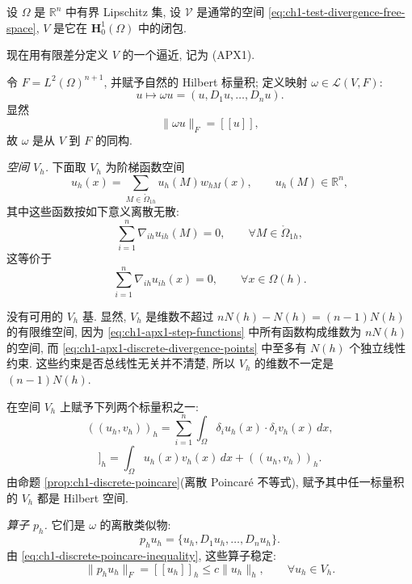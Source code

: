 设 $\Omega$ 是 $\mathbb R^n$ 中有界 Lipschitz 集, 设 $\mathcal V$ 是通常的空间 \eqref{eq:ch1-test-divergence-free-space}, $V$ 是它在 $\mathbf H_0^1(\Omega)$ 中的闭包.

现在用有限差分定义 $V$ 的一个逼近, 记为 (APX1).

令 $F=L^2(\Omega)^{n+1}$, 并赋予自然的 Hilbert 标量积; 定义映射 $\omega\in\mathcal L(V,F)$:
\[
u\longmapsto\omega u=(u,D_1u,\ldots,D_nu).
\]
显然
\[
\|\omega u\|_F=[[u]],
\]
故 $\omega$ 是从 $V$ 到 $F$ 的同构.

\emph{空间 $V_h$.} 下面取 $V_h$ 为阶梯函数空间
\begin{equation}
u_h(x)=\sum_{M\in\mathring\Omega_{1h}}u_h(M)w_{hM}(x),
\qquad u_h(M)\in\mathbb R^n,
\label{eq:ch1-apx1-step-functions}
\end{equation}
其中这些函数按如下意义离散无散:
\begin{equation}
\sum_{i=1}^n\nabla_{ih}u_{ih}(M)=0,
\qquad\forall M\in\mathring\Omega_{1h},
\label{eq:ch1-apx1-discrete-divergence-points}
\end{equation}
这等价于
\begin{equation}
\sum_{i=1}^n\nabla_{ih}u_{ih}(x)=0,
\qquad\forall x\in\Omega(h).
\label{eq:ch1-apx1-discrete-divergence-domain}
\end{equation}

没有可用的 $V_h$ 基. 显然, $V_h$ 是维数不超过 $nN(h)-N(h)=(n-1)N(h)$ 的有限维空间, 因为 \eqref{eq:ch1-apx1-step-functions} 中所有函数构成维数为 $nN(h)$ 的空间, 而 \eqref{eq:ch1-apx1-discrete-divergence-points} 中至多有 $N(h)$ 个独立线性约束. 这些约束是否总线性无关并不清楚, 所以 $V_h$ 的维数不一定是 $(n-1)N(h)$.

在空间 $V_h$ 上赋予下列两个标量积之一:
\begin{equation}
((u_h,v_h))_h
=\sum_{i=1}^n\int_\Omega\delta_iu_h(x)\cdot\delta_iv_h(x)\,dx,
\label{eq:ch1-apx1-gradient-inner-product}
\end{equation}
\begin{equation}
[[u_h,v_h]]_h
=\int_\Omega u_h(x)v_h(x)\,dx+((u_h,v_h))_h.
\label{eq:ch1-apx1-h01-inner-product}
\end{equation}
由命题 \ref{prop:ch1-discrete-poincare}(离散 Poincaré 不等式), 赋予其中任一标量积的 $V_h$ 都是 Hilbert 空间.

\emph{算子 $p_h$.} 它们是 $\omega$ 的离散类似物:
\begin{equation}
p_hu_h=\{u_h,D_1u_h,\ldots,D_nu_h\}.
\label{eq:ch1-apx1-prolongation}
\end{equation}
由 \eqref{eq:ch1-discrete-poincare-inequality}, 这些算子稳定:
\begin{equation}
\|p_hu_h\|_F=[[u_h]]_h\leq c\|u_h\|_h,
\qquad\forall u_h\in V_h.
\label{eq:ch1-apx1-prolongation-stability}
\end{equation}


